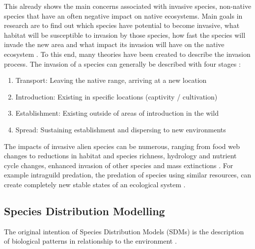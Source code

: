 \documentclass[12pt,a4paper]{article}
\begin{document}
This already shows the main concerns associated with invasive species, non-native species that have an often negative impact on native ecosystems.
Main goals in research are to find out which species have potential to become invasive, what habitat will be susceptible to invasion by those species, how fast the species will invade the new area and what impact its invasion will have on the native ecosystem \cite{shigesada1997invasions}. To this end, many theories have been created to describe the invasion process.
The invasion of a species can  generally be described with four stages \cite{blackburn2011invasionstages}: 
\begin{enumerate}
    \item Transport: Leaving the native range, arriving at a new location
    \item Introduction: Existing in specific locations (captivity / cultivation)
    \item Establishment: Existing outside of areas of introduction in the wild
    \item Spread: Sustaining establishment and dispersing to new environments
\end{enumerate}

The impacts of invasive alien species can be numerous, ranging from food web changes to reductions in habitat and species richness, hydrology and nutrient cycle changes, enhanced invasion of other species and mass extinctions \cite{simberloff2013invasiveimpacts}.
For example intraguild predation, the predation of species using similar resources, can create completely new stable states of an ecological system \cite{polis1989theoryIGP}.

\subsection{Species Distribution Modelling}
The original intention of Species Distribution Models (SDMs) is the description of biological patterns in relationship to the environment \cite{elith2009sdmtheory}.
\end{document}
